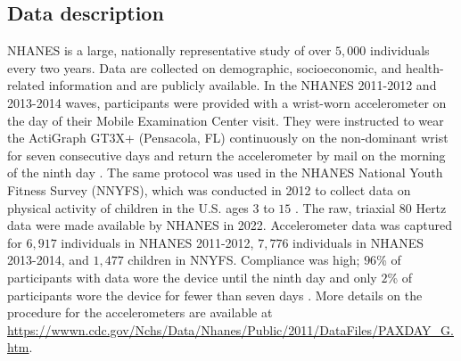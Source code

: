 \subsection{Data description}\label{subsec:datadescription}
NHANES is a large, nationally representative study of over $5{,}000$ individuals every two years. Data are collected on demographic, socioeconomic, and health-related information and are publicly available. In the NHANES 2011-2012 and 2013-2014 waves, participants were provided with a wrist-worn accelerometer on the day of their Mobile Examination Center visit. They were instructed to wear the ActiGraph GT3X+ (Pensacola, FL) continuously on the non-dominant wrist for seven consecutive days and return the accelerometer by mail on the morning of the ninth day \citep{paxming, paxminh}. The same protocol was used in the NHANES National Youth Fitness Survey (NNYFS), which was conducted in 2012 to collect data on physical activity of children in the U.S. ages $3$ to $15$ \citep{paxminy}. 
The raw, triaxial $80$ Hertz data were made available by NHANES in 2022. Accelerometer data was captured for $6{,}917$ individuals in NHANES 2011-2012, $7{,}776$ individuals in NHANES 2013-2014, and $1{,}477$ children in NNYFS. Compliance was high; $96$\% of participants with data wore the device until the ninth day and only $2$\% of participants wore the device for fewer than seven days \citep{paxming, paxminh, paxminy}. More details on the procedure for the accelerometers are available at  \url{https://wwwn.cdc.gov/Nchs/Data/Nhanes/Public/2011/DataFiles/PAXDAY_G.htm}. 



